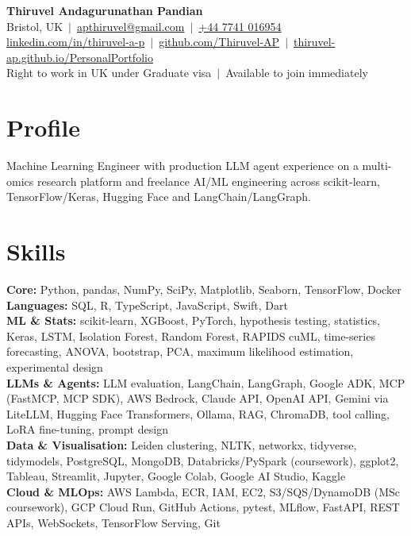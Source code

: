 \documentclass[a4paper,11pt]{article}
\begin{document}
\fontsize{11}{13.2}\selectfont

\begin{center}
  {\LARGE\bfseries Thiruvel Andagurunathan Pandian}\\[3pt]
  Bristol, UK \,$|$\, \href{mailto:apthiruvel@gmail.com}{apthiruvel@gmail.com} \,$|$\, \href{tel:+447741016954}{+44 7741 016954}\\[1pt]
\href{https://www.linkedin.com/in/thiruvel-a-p/}{linkedin.com/in/thiruvel-a-p} \,$|$\, \href{https://github.com/Thiruvel-AP}{github.com/Thiruvel-AP} \,$|$\, \href{https://thiruvel-ap.github.io/PersonalPortfolio/}{thiruvel-ap.github.io/PersonalPortfolio}\\[1pt]
  Right to work in UK under Graduate visa \,$|$\, Available to join immediately
\end{center}

\section{Profile}
Machine Learning Engineer with production LLM agent experience on a multi-omics research platform and freelance AI/ML engineering across scikit-learn, TensorFlow/Keras, Hugging Face and LangChain/LangGraph.

\section{Skills}
\textbf{Core:} Python, pandas, NumPy, SciPy, Matplotlib, Seaborn, TensorFlow, Docker\\[2pt]
\textbf{Languages:} SQL, R, TypeScript, JavaScript, Swift, Dart\\[2pt]
\textbf{ML \& Stats:} scikit-learn, XGBoost, PyTorch, hypothesis testing, statistics, Keras, LSTM, Isolation Forest, Random Forest, RAPIDS cuML, time-series forecasting, ANOVA, bootstrap, PCA, maximum likelihood estimation, experimental design\\[2pt]
\textbf{LLMs \& Agents:} LLM evaluation, LangChain, LangGraph, Google ADK, MCP (FastMCP, MCP SDK), AWS Bedrock, Claude API, OpenAI API, Gemini via LiteLLM, Hugging Face Transformers, Ollama, RAG, ChromaDB, tool calling, LoRA fine-tuning, prompt design\\[2pt]
\textbf{Data \& Visualisation:} Leiden clustering, NLTK, networkx, tidyverse, tidymodels, PostgreSQL, MongoDB, Databricks/PySpark (coursework), ggplot2, Tableau, Streamlit, Jupyter, Google Colab, Google AI Studio, Kaggle\\[2pt]
\textbf{Cloud \& MLOps:} AWS Lambda, ECR, IAM, EC2, S3/SQS/DynamoDB (MSc coursework), GCP Cloud Run, GitHub Actions, pytest, MLflow, FastAPI, REST APIs, WebSockets, TensorFlow Serving, Git
\end{document}
